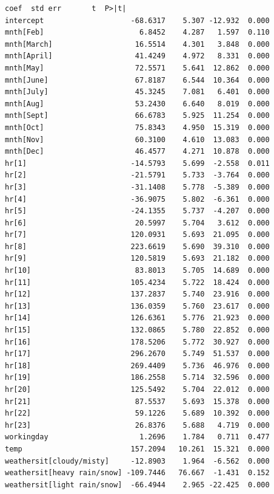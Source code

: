 \documentclass[11pt]{article}
\makeatletter
\newcommand{\boxspacing}{\kern\kvtcb@left@rule\kern\kvtcb@boxsep}
\newcommand{\prompt}[4]{
        {\ttfamily\llap{{\color{#2}[#3]:\hspace{3pt}#4}}\vspace{-\baselineskip}}
    }
\makeatother
\begin{document}
            \begin{tcolorbox}[breakable, size=fbox, boxrule=.5pt, pad at break*=1mm, opacityfill=0]
\prompt{Out}{outcolor}{66}{\boxspacing}
\begin{Verbatim}[commandchars=\\\{\}]
                                 coef  std err       t  P>|t|
intercept                    -68.6317    5.307 -12.932  0.000
mnth[Feb]                      6.8452    4.287   1.597  0.110
mnth[March]                   16.5514    4.301   3.848  0.000
mnth[April]                   41.4249    4.972   8.331  0.000
mnth[May]                     72.5571    5.641  12.862  0.000
mnth[June]                    67.8187    6.544  10.364  0.000
mnth[July]                    45.3245    7.081   6.401  0.000
mnth[Aug]                     53.2430    6.640   8.019  0.000
mnth[Sept]                    66.6783    5.925  11.254  0.000
mnth[Oct]                     75.8343    4.950  15.319  0.000
mnth[Nov]                     60.3100    4.610  13.083  0.000
mnth[Dec]                     46.4577    4.271  10.878  0.000
hr[1]                        -14.5793    5.699  -2.558  0.011
hr[2]                        -21.5791    5.733  -3.764  0.000
hr[3]                        -31.1408    5.778  -5.389  0.000
hr[4]                        -36.9075    5.802  -6.361  0.000
hr[5]                        -24.1355    5.737  -4.207  0.000
hr[6]                         20.5997    5.704   3.612  0.000
hr[7]                        120.0931    5.693  21.095  0.000
hr[8]                        223.6619    5.690  39.310  0.000
hr[9]                        120.5819    5.693  21.182  0.000
hr[10]                        83.8013    5.705  14.689  0.000
hr[11]                       105.4234    5.722  18.424  0.000
hr[12]                       137.2837    5.740  23.916  0.000
hr[13]                       136.0359    5.760  23.617  0.000
hr[14]                       126.6361    5.776  21.923  0.000
hr[15]                       132.0865    5.780  22.852  0.000
hr[16]                       178.5206    5.772  30.927  0.000
hr[17]                       296.2670    5.749  51.537  0.000
hr[18]                       269.4409    5.736  46.976  0.000
hr[19]                       186.2558    5.714  32.596  0.000
hr[20]                       125.5492    5.704  22.012  0.000
hr[21]                        87.5537    5.693  15.378  0.000
hr[22]                        59.1226    5.689  10.392  0.000
hr[23]                        26.8376    5.688   4.719  0.000
workingday                     1.2696    1.784   0.711  0.477
temp                         157.2094   10.261  15.321  0.000
weathersit[cloudy/misty]     -12.8903    1.964  -6.562  0.000
weathersit[heavy rain/snow] -109.7446   76.667  -1.431  0.152
weathersit[light rain/snow]  -66.4944    2.965 -22.425  0.000
\end{Verbatim}
\end{tcolorbox}
        
\end{document}
